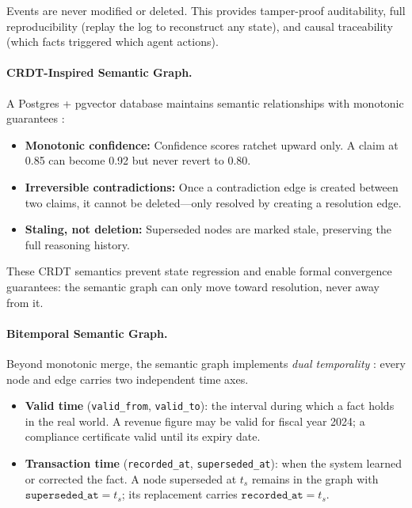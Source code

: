 \documentclass[11pt]{article}
\begin{document}
Events are never modified or deleted. This provides tamper-proof auditability, full reproducibility (replay the log to reconstruct any state), and causal traceability (which facts triggered which agent actions).

\paragraph{CRDT-Inspired Semantic Graph.}
A Postgres + pgvector database maintains semantic relationships with monotonic guarantees \cite{laddad2024}:

\begin{itemize}
  \item \textbf{Monotonic confidence:} Confidence scores ratchet upward only. A claim at 0.85 can become 0.92 but never revert to 0.80.
  \item \textbf{Irreversible contradictions:} Once a contradiction edge is created between two claims, it cannot be deleted---only resolved by creating a resolution edge.
  \item \textbf{Staling, not deletion:} Superseded nodes are marked stale, preserving the full reasoning history.
\end{itemize}

These CRDT semantics prevent state regression and enable formal convergence guarantees: the semantic graph can only move toward resolution, never away from it.

\paragraph{Bitemporal Semantic Graph.}
Beyond monotonic merge, the semantic graph implements \emph{dual temporality} \cite{snodgrass2000}: every node and edge carries two independent time axes.

\begin{itemize}
  \item \textbf{Valid time} (\texttt{valid\_from}, \texttt{valid\_to}): the interval during which a fact holds in the real world. A revenue figure may be valid for fiscal year 2024; a compliance certificate valid until its expiry date.
  \item \textbf{Transaction time} (\texttt{recorded\_at}, \texttt{superseded\_at}): when the system learned or corrected the fact. A node superseded at $t_s$ remains in the graph with $\texttt{superseded\_at} = t_s$; its replacement carries $\texttt{recorded\_at} = t_s$.
\end{itemize}
\end{document}
